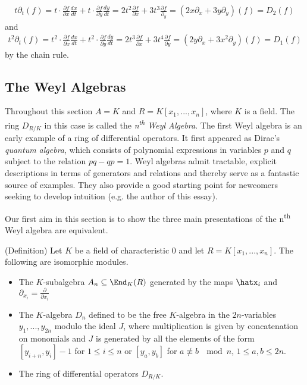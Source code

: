 \begin{example}
	\begin{align*}
		t\partial_t(f) = t\cdot \frac{\partial f}{\partial x} \frac{dx}{dt} + t\cdot \frac{\partial f}{\partial y} \frac{dy}{dt} = 2t^2\frac{\partial f}{\partial x} + 3t^3\frac{\partial f}{\partial_y} = (2x\partial_x + 3y\partial_y)(f) = D_2(f)
	\end{align*}
	and
	\begin{align*}
		t^2\partial_t(f) = t^2\cdot \frac{\partial f}{\partial x}\frac{dx}{dt} + t^2 \cdot \frac{\partial f}{\partial y}\frac{dy}{dt} = 2t^3\frac{\partial f}{\partial x} + 3t^4\frac{\partial f}{\partial y} = (2y\partial_x + 3x^2\partial_y)(f) = D_1(f)
	\end{align*}
	by the chain rule. 
\end{example}
\subsection{The Weyl Algebras}\label{sec:Weyl-algebra}

Throughout this section $A = K$ and $R = K[x_1,...,x_n]$, where $K$ is a field. The ring $D_{R/K}$ in this case is called the \emph{n\textsuperscript{th} Weyl Algebra}. The first Weyl algebra is an early example of a ring of differential operators. It first appeared as Dirac's \emph{quantum algebra}, which consists of polynomial expressions in variables $p$ and $q$ subject to the relation $pq - qp = 1$. Weyl algebras admit tractable, explicit descriptions in terms of generators and relations and thereby serve as a fantastic source of examples. They also provide a good starting point for newcomers seeking to develop intuition (e.g. the author of this essay).

Our first aim in this section is to show the three main presentations of the n\textsuperscript{th} Weyl algebra are equivalent.

\begin{thm}(Definition)\label{thm:Weyl-algebra-defs}
	Let $K$ be a field of characteristic $0$ and let $R = K[x_1,...,x_n]$. The following are isomorphic modules.
	\begin{itemize}
		\item The $K$-subalgebra $A_n \subseteq \End_K(R)$ generated by the maps $\hatx_i$ and $\partial_{x_i} = \frac{\partial}{\partial x_i}$
		\item The $K$-algebra $D_n$ defined to be the free $K$-algebra in the $2n$-variables $y_1,...,y_{2n}$ modulo the ideal $J$, where multiplication is given by concatenation on monomials and $J$ is generated by all the elements of the form $[y_{i+n},y_{i}] - 1$ for $1\leq i\leq n$ or $[y_a,y_b]$ for $a \not\equiv b ~ \mod n$, $1\leq a,b\leq 2n$.
		\item The ring of differential operators $D_{R/K}$.
	\end{itemize}
\end{thm}

